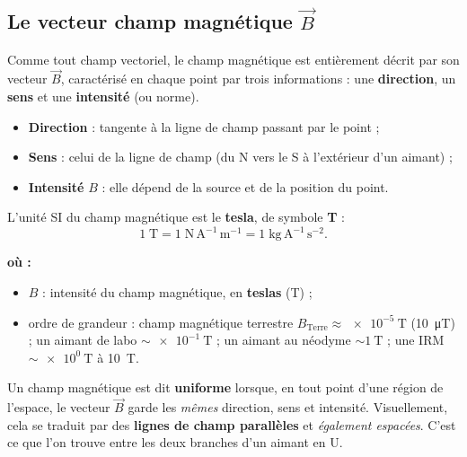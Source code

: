 \documentclass[11pt,a4paper]{article}
\newenvironment{ou}{%
  \par\smallskip\noindent\textbf{où :}\nopagebreak
  \begin{itemize}[leftmargin=1.8em,topsep=2pt,itemsep=1.5pt,parsep=0pt]}%
  {\end{itemize}}
\newcommand{\Bvec}{\vec{B}}
\begin{document}
\subsection{Le vecteur champ magnétique $\Bvec$}

Comme tout champ vectoriel, le champ magnétique est entièrement décrit par son vecteur $\Bvec$,
caractérisé en chaque point par trois informations : une \textbf{direction}, un \textbf{sens}
et une \textbf{intensité} (ou norme).

\begin{definition}
\hfill
\begin{itemize}[leftmargin=1.6em,topsep=2pt,itemsep=1pt]
  \item \textbf{Direction} : tangente à la ligne de champ passant par le point ;
  \item \textbf{Sens} : celui de la ligne de champ (du N vers le S à l'extérieur d'un aimant) ;
  \item \textbf{Intensité} $B$ : elle dépend de la source et de la position du point.
\end{itemize}
\end{definition}

\begin{formule}
L'unité SI du champ magnétique est le \textbf{tesla}, de symbole \textbf{T} :
\[ 1\;\text{T} = 1\;\text{N}\,\text{A}^{-1}\,\text{m}^{-1} = 1\;\text{kg}\,\text{A}^{-1}\,\text{s}^{-2}. \]
\begin{ou}
  \item $B$ : intensité du champ magnétique, en \textbf{teslas} (\si{\tesla}) ;
  \item ordre de grandeur : champ magnétique terrestre $B_{\text{Terre}}\approx\SI{e-5}{\tesla}$
        (\SI{10}{\micro\tesla}) ; un aimant de labo $\sim\SI{e-1}{\tesla}$ ;
        un aimant au néodyme $\sim\SI{1}{\tesla}$ ; une IRM $\sim\SI{e0}{\tesla}$ à \SI{10}{\tesla}.
\end{ou}
\end{formule}

\begin{remarque}
Un champ magnétique est dit \textbf{uniforme} lorsque, en tout point d'une région de l'espace, le
vecteur $\Bvec$ garde les \emph{mêmes} direction, sens et intensité. Visuellement, cela se traduit
par des \textbf{lignes de champ parallèles} et \emph{également espacées}. C'est ce que l'on trouve
entre les deux branches d'un aimant en U.
\end{remarque}
\end{document}
